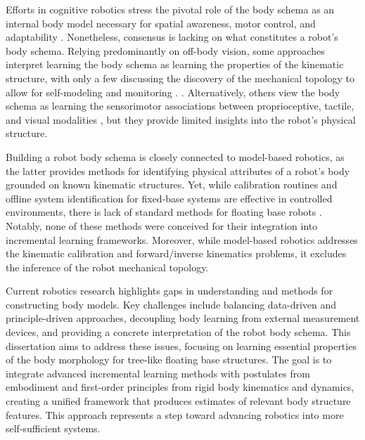 \documentclass[12pt, a4paper]{article}
\begin{document}
Efforts in cognitive robotics stress the pivotal role of the body schema as an internal body model necessary for spatial awareness, motor control, and adaptability \cite{Nguyen2021Sensorimotorrepresentationlearning,Hoffmann2010Bodyschemarobotics}. Nonetheless, consensus is lacking on what constitutes a robot's body schema. Relying predominantly on off-body vision, some approaches interpret learning the body schema as learning the properties of the kinematic structure, with only a few discussing the discovery of the mechanical topology to allow for self-modeling and monitoring \cite{Bongard2006Automatedsynthesisbody,Bongard2006Resilientmachinescontinuous}. \cite{Hersch2008Onlinelearningbody,MartinezCantin2010Bodyschemaacquisition,Hart2011roboticmodelecological,Lipson2019Taskagnosticself,Chen2022Fullybodyvisual,Sturm2009Bodyschemalearning}. Alternatively, others view the body schema as learning the sensorimotor associations between proprioceptive, tactile, and visual modalities \cite{Fuke2007BodyImageConstructed,Malinovska2022connectionistmodelassociating,Nguyen2019Reachingdevelopmentvisuo,Pugach2019BrainInspiredCoding,Lanillos2016Yieldingselfperception}, but they provide limited insights into the robot's physical structure. 

Building a robot body schema is closely connected to model-based robotics, as the latter provides methods for identifying physical attributes of a robot's body grounded on known kinematic structures. Yet, while calibration routines \cite{Hollerbach1996CalibrationIndexTaxonomy} and offline system identification \cite{Swevers2007Dynamicmodelidentification,LeboutetInertialParameterIdentification} for fixed-base systems are effective in controlled environments, there is lack of standard methods for floating base robots \cite{Ayusawa2014Identifiabilityidentificationinertial,Lee2022OptimizedSystemIdentification}. Notably, none of these methods were conceived for their integration into incremental learning frameworks. Moreover, while model-based robotics addresses the kinematic calibration and forward/inverse kinematics problems, it excludes the inference of the robot mechanical topology. 

Current robotics research highlights gaps in understanding and methods for constructing body models. Key challenges include balancing data-driven and principle-driven approaches, decoupling body learning from external measurement devices, and providing a concrete interpretation of the robot body schema. This dissertation aims to address these issues, focusing on learning essential properties of the body morphology for tree-like floating base structures. The goal is to integrate advanced incremental learning methods with postulates from embodiment and first-order principles from rigid body kinematics and dynamics, creating a unified framework that produces estimates of relevant body structure features. This approach represents a step toward advancing robotics into more self-sufficient systems.
\end{document}
